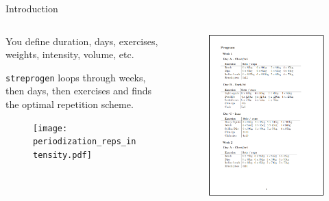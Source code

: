 \documentclass[11pt, aspectratio=149]{beamer}
\theoremstyle{plain}
\begin{document}
\begin{frame}[fragile, t]{Introduction}
	\begin{columns}
		\begin{column}{0.6\textwidth}
		You define duration, days, exercises, weights, intensity, volume, etc.
		\vspace*{1em}
		
		\texttt{streprogen} loops through weeks, then days, then exercises and finds the optimal repetition scheme.
		
		\begin{figure}
			\centering
			\texttt{[image: periodization\_reps\_intensity.pdf]}
		\end{figure}
	
		\end{column}
		\begin{column}{0.4\textwidth}
			\begin{figure}
				\centering
				\includegraphics[width=1\linewidth]{streprogen_output.png}
			\end{figure}
		\end{column}
	\end{columns}
\end{frame}
\end{document}
